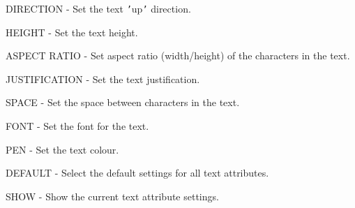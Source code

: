 \documentclass[11pt,nolof,noabs]{starlink}
\begin{document}
\begin{small}
{{{          DIRECTION - Set the text \texttt{'}up\texttt{'} direction.

          HEIGHT - Set the text height.

          ASPECT RATIO - Set aspect ratio (width/height) of the
          characters in the text.

          JUSTIFICATION - Set the text justification.

          SPACE - Set the space between characters in the text.

          FONT - Set the font for the text.

          PEN - Set the text colour.

          DEFAULT - Select the default settings for all text attributes.

          SHOW - Show the current text attribute settings.

}}}
\end{small}
\end{document}
